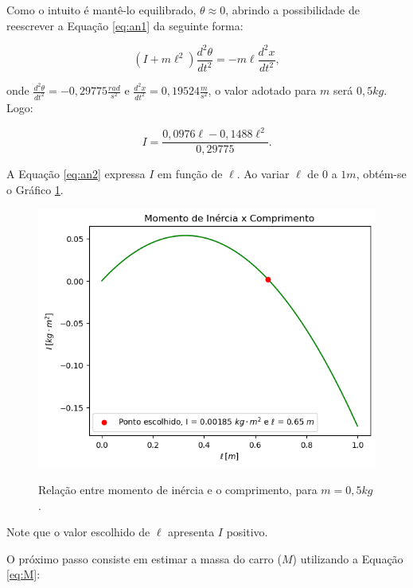 \documentclass[12pt,           %
a4paper,                       %
openany,                       %
oneside,                       %
chapter=TITLE,                 %
english,                       %
spanish,                       %
brazil,                        %
sumario=tradicional]{abntex2}  %
\begin{document}
\begin{OnehalfSpace}
Como o intuito é mantê-lo equilibrado, $\theta \approx 0$, abrindo a possibilidade de reescrever a Equação \ref{eq:an1} da seguinte forma:

\begin{equation}
    (I + m\ell^2)\frac{d^2\theta}{dt^2}   = - m\ell\frac{d^2x}{dt^2},
    \label{eq:an22}
\end{equation}

\noindent onde $\frac{d^2\theta}{dt^2} = -0,29775\frac{rad}{s^2}$ e $\frac{d^2x}{dt^2} = 0,19524\frac{m}{s^2}$, o valor adotado para $m$ será $0,5 kg$. Logo:

\begin{equation}
    I = \frac{0,0976\ell - 0,1488\ell^2}{0,29775}.
    \label{eq:an2}
\end{equation}

A Equação \ref{eq:an2} expressa $I$ em função de $\ell$. Ao variar $\ell$ de $0$ a $1m$, obtém-se o Gráfico \ref{miec}.

\begin{figure}[H]
     \centering
     \vspace*{-0.2cm}
     \caption{Relação entre momento de inércia e o comprimento, para $m=0,5kg$.}
     \includegraphics[scale=.55]{Grafico2.png}
     \label{miec}
\end{figure}
\vspace*{-.85cm}
{\raggedright {}}

Note que o valor escolhido de $\ell$ apresenta $I$ positivo.

O próximo passo consiste em estimar a massa do carro  (\(M\)) utilizando a Equação \ref{eq:M}:


\end{OnehalfSpace}
\end{document}
